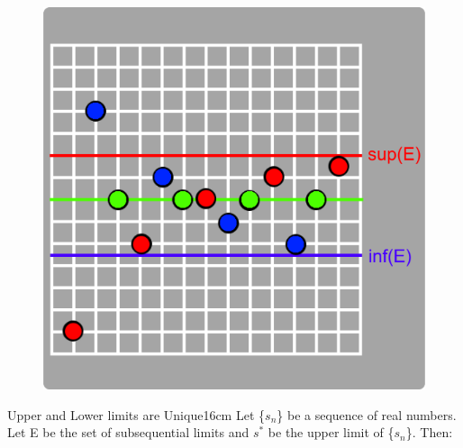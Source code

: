 	\begin{figure}[h]
		\centering
		\includegraphics[scale=0.3]{Images/9.1.2.png}
	\end{figure}



	\begin{wtheorem}{Upper and Lower limits are Unique}{16cm}
		Let \{$s_n$\} be a sequence of real numbers.
		Let E be the set of subsequential limits and
		$s^*$ be the upper limit of \{$s_n$\}. Then:
	\end{wtheorem}

